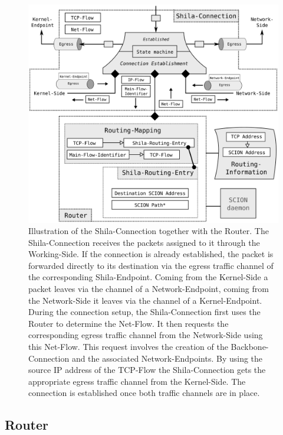 \begin{figure}
	\begin{center}
		\def\svgwidth{1\textwidth}
		\includegraphics[scale=0.2]{../illustrations/implementation/PartsShilaConnection.pdf}   
		\caption[]{Illustration of the Shila-Connection together with the Router. The Shila-Connection receives the packets assigned to it through the Working-Side. If the connection is already established, the packet is forwarded directly to its destination via the egress traffic channel of the corresponding Shila-Endpoint. Coming from the Kernel-Side a packet leaves via the channel of a Network-Endpoint, coming from the Network-Side it leaves via the channel of a Kernel-Endpoint. During the connection setup, the Shila-Connection first uses the Router to determine the Net-Flow. It then requests the corresponding egress traffic channel from the Network-Side using this Net-Flow. This request involves the creation of the Backbone-Connection and the associated Network-Endpoints. By using the source IP address of the TCP-Flow the Shila-Connection gets the appropriate egress traffic channel from the Kernel-Side. The connection is established once both traffic channels are in place.}
		\label{fig:ImplementationShilaConnection}
	\end{center}
\end{figure}

\subsection*{Router}
\label{sec:ImplementationRouter}

